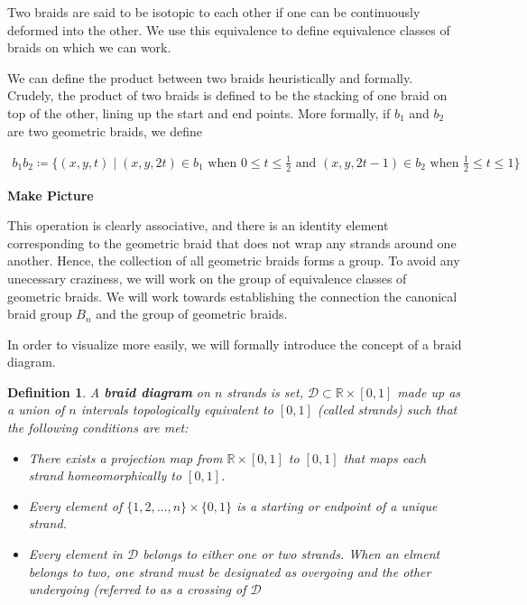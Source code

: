 \documentclass[10pt]{ucthesis}
\newcommand{\R}{\mathbb{R}}
\newtheorem{definition}{Definition}[chapter]
\begin{document}
Two braids are said to be isotopic to each other if one can be continuously deformed into the other. We use this equivalence to define equivalence classes of braids on which we can work.

We can define the product between two braids heuristically and formally. Crudely, the product of two braids is defined to be the stacking of one braid on top of the other, lining up the start and end points. More formally, if $b_1$ and $b_2$ are two geometric braids, we define 

\begin{equation}
\begin{aligned}
	b_1b_2 \coloneq \{(x,y,t)\mid (x,y,2t)\in b_1 \text{ when }0\leq t\leq \frac{1}{2} \text{ and }   (x,y,2t - 1)\in b_2 \text{ when }\frac{1}{2}\leq t\leq 1\}
\end{aligned}
\end{equation}

\textbf{Make Picture}

This operation is clearly associative, and there is an identity element corresponding to the geometric braid that does not wrap any strands around one another. Hence, the collection of all geometric braids forms a group. To avoid any unecessary craziness, we will work on the group of equivalence classes of geometric braids. We will work towards establishing the connection the canonical braid group $B_n$ and the group of geometric braids.

In order to visualize more easily, we will formally introduce the concept of a braid diagram.

\begin{definition}
	A \textbf{braid diagram} on $n$ strands is set, $\mathcal{D}\subset \R\times [0,1]$ made up as a union of $n$ intervals topologically equivalent to $[0,1]$ (called strands) such that the following conditions are met:
\begin{itemize}
	\item There exists a projection map from $\R\times [0,1]$ to $[0,1]$ that maps each strand homeomorphically to $[0,1]$.
	\item Every element of $\{1,2,\hdots,n\}\times\{0,1\}$ is a starting or endpoint of a unique strand.
	\item Every element in $\mathcal{D}$ belongs to either one or two strands. When an elment belongs to two, one strand must be designated as overgoing and the other undergoing (referred to as a crossing of $\mathcal{D}$
\end{itemize}
\end{definition}
\end{document}
